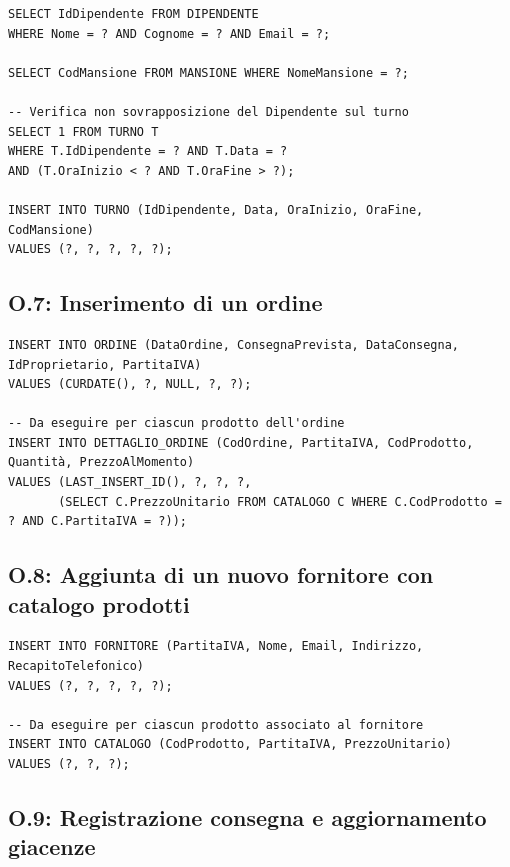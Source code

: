 \begin{lstlisting}[caption={O.6: Aggiunta di un nuovo turno di lavoro}]
SELECT IdDipendente FROM DIPENDENTE 
WHERE Nome = ? AND Cognome = ? AND Email = ?;

SELECT CodMansione FROM MANSIONE WHERE NomeMansione = ?;

-- Verifica non sovrapposizione del Dipendente sul turno
SELECT 1 FROM TURNO T 
WHERE T.IdDipendente = ? AND T.Data = ? 
AND (T.OraInizio < ? AND T.OraFine > ?);

INSERT INTO TURNO (IdDipendente, Data, OraInizio, OraFine, CodMansione)
VALUES (?, ?, ?, ?, ?);
\end{lstlisting}

\clearpage

\subsection*{O.7: Inserimento di un ordine}

\begin{lstlisting}[caption={O.7: Inserimento di un ordine}]
INSERT INTO ORDINE (DataOrdine, ConsegnaPrevista, DataConsegna, IdProprietario, PartitaIVA)
VALUES (CURDATE(), ?, NULL, ?, ?);

-- Da eseguire per ciascun prodotto dell'ordine
INSERT INTO DETTAGLIO_ORDINE (CodOrdine, PartitaIVA, CodProdotto, Quantità, PrezzoAlMomento)
VALUES (LAST_INSERT_ID(), ?, ?, ?, 
       (SELECT C.PrezzoUnitario FROM CATALOGO C WHERE C.CodProdotto = ? AND C.PartitaIVA = ?));
\end{lstlisting}

\subsection*{O.8: Aggiunta di un nuovo fornitore con catalogo prodotti}

\begin{lstlisting}[caption={O.8: Aggiunta di un nuovo fornitore con catalogo prodotti}]
INSERT INTO FORNITORE (PartitaIVA, Nome, Email, Indirizzo, RecapitoTelefonico)
VALUES (?, ?, ?, ?, ?);

-- Da eseguire per ciascun prodotto associato al fornitore
INSERT INTO CATALOGO (CodProdotto, PartitaIVA, PrezzoUnitario)
VALUES (?, ?, ?);
\end{lstlisting}

\subsection*{O.9: Registrazione consegna e aggiornamento giacenze}


